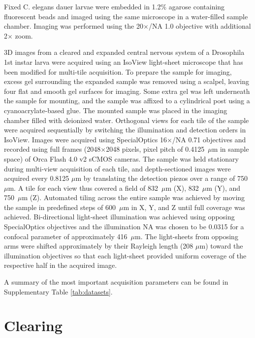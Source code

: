 Fixed C. elegans dauer larvae were embedded in 1.2$\%$ agarose containing fluorescent beads and imaged using the same microscope in a water-filled sample chamber. Imaging was performed using the 20$\times$/NA 1.0 objective with additional 2$\times$ zoom. 

3D images from a cleared and expanded central nervous system of a Drosophila 1st instar larva were acquired using an IsoView light-sheet microscope\cite{isoview} that has been modified for multi-tile acquisition. To prepare the sample for imaging, excess gel surrounding the expanded sample was removed using a scalpel, leaving four flat and smooth gel surfaces for imaging. Some extra gel was left underneath the sample for mounting, and the sample was affixed to a cylindrical post using a cyanoacrylate-based glue. The mounted sample was placed in the imaging chamber filled with deionized water. Orthogonal views for each tile of the sample were acquired sequentially by switching the illumination and detection orders in IsoView. Images were acquired using SpecialOptics 16$\times$/NA 0.71 objectives and recorded using full frames (2048$\times$2048 pixels, pixel pitch of 0.4125~$\mu$m in sample space) of Orca Flash 4.0 v2 sCMOS cameras. The sample was held stationary during multi-view acquisition of each tile, and depth-sectioned images were acquired every 0.8125 $\mu$m by translating the detection piezos over a range of 750~$\mu$m. A tile for each view thus covered a field of 832~$\mu$m (X), 832~$\mu$m (Y), and 750~$\mu$m (Z). Automated tiling across the entire sample was achieved by moving the sample in predefined steps of 600~$\mu$m in X, Y, and Z until full coverage was achieved. Bi-directional light-sheet illumination was achieved using opposing SpecialOptics objectives and the illumination NA was chosen to be 0.0315 for a confocal parameter of approximately 416~$\mu$m. The light-sheets from opposing arms were shifted approximately by their Rayleigh length (208 $\mu$m) toward the illumination objectives so that each light-sheet provided uniform coverage of the respective half in the acquired image. 

A summary of the most important acquisition parameters can be found in Supplementary Table \ref{tab:datasets}.

\section{Clearing}
\label{sec:clearing}

